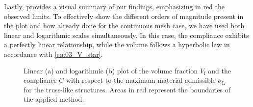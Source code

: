 Lastly,  provides a visual summary of our findings, emphasizing in red the observed limits. To effectively show the different orders of magnitude present in the plot and how already done for the continuous mesh case, we have used both linear and logarithmic scales simultaneously. In this case, the compliance exhibits a perfectly linear relationship, while the volume follows a hyperbolic law in accordance with \eqref{eq:03_V_star}.

\begin{figure}[]
    \hspace*{\fill}
    \hfill
    \hspace*{\fill}
    \caption{Linear (a) and logarithmic (b) plot of the volume fraction $V_\text{f}$ and the compliance $C$ with respect to the maximum material admissible $\sigma_\text{L}$ for the truss-like structures. Areas in red represent the boundaries of the applied method.}
    \label{fig:03_tto_plot}
\end{figure}

